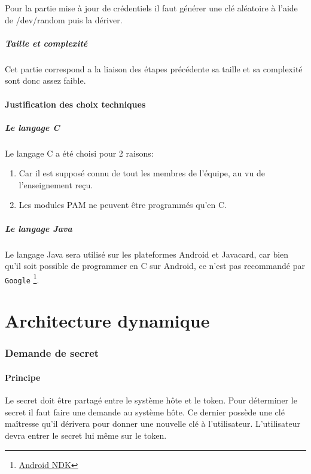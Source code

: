 \documentclass{"../../res/univ-projet"}
\begin{document}
  Pour la partie mise à jour de crédentiels il faut générer une clé aléatoire
  à l'aide de /dev/random puis la dériver.
  
\subsubsection{Taille et complexité}
  Cet partie correspond a la liaison des étapes précédente sa taille et
  sa complexité sont donc assez faible.
  
\subsection{Justification des choix techniques}
\subsubsection{Le langage C}
Le langage C a été choisi pour 2 raisons:
\begin{enumerate}
    \item Car il est supposé connu de tout les membres de l'équipe, au vu
        de l'enseignement reçu.
    \item Les modules PAM ne peuvent être programmés qu'en C.
\end{enumerate}

\subsubsection{Le langage Java}
    Le langage Java sera utilisé sur les plateformes Android
    et Javacard, car bien qu'il soit possible de programmer en C
    sur Android, ce n'est pas recommandé par \verb?Google?
    \footnote{\href{https://developer.android.com/tools/sdk/ndk/index.html}{Android NDK}}.
        
\part*{Architecture dynamique}

\section{Demande de secret}
\subsection{Principe}
Le secret doit être partagé entre le système hôte et le token. Pour déterminer
le secret il faut faire une demande au système hôte. Ce dernier possède une clé
maîtresse qu'il dérivera pour donner une nouvelle clé à l'utilisateur. L'utilisateur
devra entrer le secret lui même sur le token.
\end{document}
